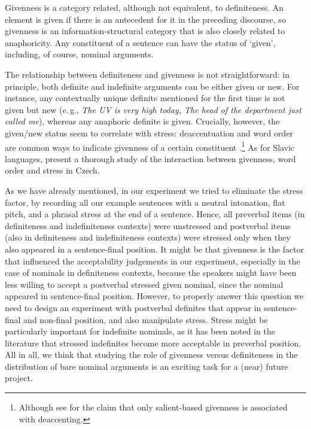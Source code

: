 \documentclass[output=paper]{langsci/langscibook}
\begin{document}
Givenness is a category related, although not equivalent, to definiteness. An element is given if there is an antecedent for it in the preceding discourse, so givenness is an information-structural category that is also closely related to anaphoricity. Any constituent of a sentence can have the status of `given', including, of course, nominal arguments.

The relationship between definiteness and givenness is not straightforward: in principle, both definite and indefinite arguments can be either given or new. For instance, any contextually unique definite mentioned for the first time is not given but new (e.\,g., {\emph{The UV is very high today, The head of the department just called me}}), whereas any anaphoric definite is given. Crucially, however, the given/new status seem to correlate with stress: deaccentuation and word order are common ways to indicate givenness of a certain constituent \citep[cf.][]{krifka:08}.\footnote{Although see \cite{rochemont:16} for the claim that only salient-based givenness is associated with deaccenting.}  As for Slavic languages, \cite{simik:wierzba:15} present a thorough study of the interaction between givenness, word order and stress in Czech.

{
As we have already mentioned, in our experiment we tried to eliminate the stress factor, by recording all our example sentences with a neutral intonation, flat pitch, and a phrasal stress at the end of a sentence. Hence, all preverbal items (in definiteness and indefiniteness contexts) were unstressed and postverbal items (also in definiteness and indefiniteness contexts) were stressed only when they also appeared in a sentence-final position. It might be that givenness is the factor that influenced the acceptability judgements in our experiment, especially in the case of nominals in definiteness contexts, because the speakers might have been less willing to accept a postverbal stressed given nominal, since the nominal appeared in sentence-final position. However, to properly answer this question we need to design an experiment with postverbal definites that appear in sentence-final and non-final position, and also manipulate stress. Stress might be particularly important for indefinite nominals, as it has been noted in the literature that stressed indefinites become more acceptable in preverbal position. All in all, we think that studying the role of givenness versus definiteness in the distribution of bare nominal arguments is an exciting task for a (near) future project.
}
\end{document}
